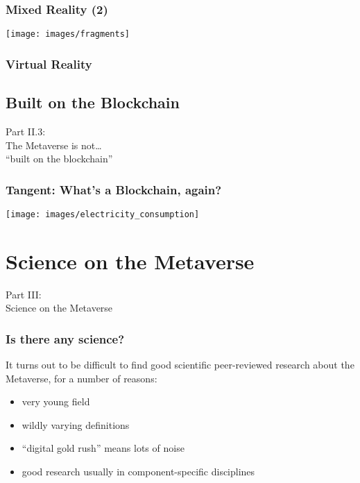 \documentclass[aspectratio=169,x11names]{beamer}
\begin{document}
\begin{frame}
\frametitle{Mixed Reality (2)}
\begin{center}
\texttt{[image: images/fragments]} 
\end{center}
\end{frame}

\begin{frame}
\frametitle{Virtual Reality}
\end{frame}


\subsection{Built on the Blockchain}

\begin{frame}
\begin{center}
\Large
Part II.3:\bigskip\\
\huge
The Metaverse is not\dots\\ ``built on the blockchain''
\end{center}
\end{frame}

\begin{frame}
\frametitle{Tangent: What's a Blockchain, again?}
\end{frame}

\begin{frame}
\begin{center}
\texttt{[image: images/electricity\_consumption]} 
\end{center}
\end{frame}

\section{Science on the Metaverse}

\begin{frame}
\begin{center}
\Large
Part III:\bigskip\\
\huge
Science on the Metaverse
\end{center}
\end{frame}

\begin{frame}
\frametitle{Is there any science?}
It turns out to be difficult to find good scientific peer-reviewed research about the Metaverse, for a number of reasons:
\bigskip\bigskip

\begin{itemize}
\item very young field
\item wildly varying definitions
\item ``digital gold rush'' means lots of noise
\item good research usually in component-specific disciplines
\end{itemize}
\end{frame}
\end{document}
